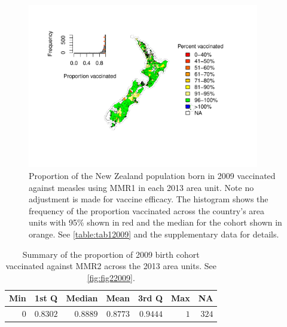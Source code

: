 \documentclass{article}
\begin{document}
\begin{figure}
\begin{center}
    \includegraphics[width=0.9\textwidth]{nir_census_MMR1_NIR_2009.pdf}
 \end{center}
    \caption{Proportion of the New Zealand population born in 2009 vaccinated against measles using MMR1 in each 2013 area unit. Note no adjustment is made for vaccine efficacy. The histogram shows the frequency of the proportion vaccinated across the country's area units with 95\% shown in red and the median for the cohort shown in orange. See \autoref{table:tab12009} and the supplementary data for details.}
\label{fig:fig12009}
\end{figure}

 \vspace{5mm} %
\begin{table}
\begin{center}
\begin{tabular}{rrrrrrr}
\hline\hline
\multicolumn{1}{c}{Min}&\multicolumn{1}{c}{1st Q}&\multicolumn{1}{c}{Median}&\multicolumn{1}{c}{Mean}&\multicolumn{1}{c}{3rd Q}&\multicolumn{1}{c}{Max}&\multicolumn{1}{c}{NA}\tabularnewline
\hline
$0$&$0.8302$&$0.8889$&$0.8773$&$0.9444$&$1$&$324$\tabularnewline
\hline
\end{tabular}\end{center}\caption{Summary of the proportion of 2009 birth cohort vaccinated against MMR2 across the 2013 area units. See \autoref{fig:fig22009}.}
\label{table:tab22009}
\end{table}
\end{document}
